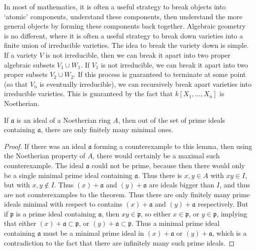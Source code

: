 In most of mathematics, it is often a useful strategy to break objects into `atomic' components, understand these components, then understand the more general objects by forming these components back together. Algebraic geometry is no different, where it is often a useful strategy to break down varieties into a finite union of irreducible varieties. The idea to break the variety down is simple. If a variety $V$ is not irreducible, then we can break it apart into two proper algebraic subsets $V_1 \cup W_1$. If $V_1$ is not irreducible, we can break it apart into two proper subsets $V_2 \cup W_2$. If this process is guaranteed to terminate at some point (so that $V_n$ is eventually irreducible), we can recursively break apart varieties into irreducible varieties. This is guaranteed by the fact that $k[X_1, \dots, X_n]$ is Noetherian.

\begin{lemma}
    If $\mathfrak{a}$ is an ideal of a Noetherian ring $A$, then out of the set of prime ideals containing $\mathfrak{a}$, there are only finitely many minimal ones.
\end{lemma}
\begin{proof}
    If there was an ideal $\mathfrak{a}$ forming a counterexample to this lemma, then using the Noetherian property of $A$, there would certainly be a maximal such counterexample. The ideal $\mathfrak{a}$ could not be prime, because then there would only be a single minimal prime ideal containing $\mathfrak{a}$. Thus there is $x,y \in A$ with $xy \in I$, but with $x,y \not \in I$. Thus $(x) + \mathfrak{a}$ and $(y) + \mathfrak{a}$ are ideals bigger than $I$, and thus are not counterexamples to the theorem. Thus there are only finitely many prime ideals minimal with respect to contains $(x) + \mathfrak{a}$ and $(y) + \mathfrak{a}$ respectively. But if $\mathfrak{p}$ is a prime ideal containing $\mathfrak{a}$, then $xy \in \mathfrak{p}$, so either $x \in \mathfrak{p}$, or $y \in \mathfrak{p}$, implying that either $(x) + \mathfrak{a} \subset \mathfrak{p}$, or $(y) + \mathfrak{a} \subset \mathfrak{p}$. Thus a minimal prime ideal containing $\mathfrak{a}$ must be a minimal prime ideal in $(x) + \mathfrak{a}$ or $(y) + \mathfrak{a}$, which is a contradiction to the fact that there are infinitely many such prime ideals.
\end{proof}


